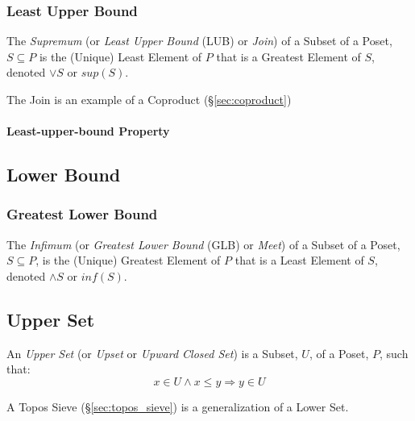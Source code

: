 \subsubsection{Least Upper Bound}\label{sec:least_upperbound}

The \emph{Supremum} (or \emph{Least Upper Bound} (LUB) or \emph{Join})
of a Subset of a Poset, $S \subseteq P$ is the (Unique) Least Element
of $P$ that is a Greatest Element of $S$, denoted $\vee S$ or $sup
(S)$.

The Join is an example of a Coproduct (\S\ref{sec:coproduct})



\paragraph{Least-upper-bound Property}\label{sec:leastupperbound_property}



\subsection{Lower Bound}\label{sec:lower_bound}

\subsubsection{Greatest Lower Bound}\label{sec:greatest_lowerbound}

The \emph{Infimum} (or \emph{Greatest Lower Bound} (GLB) or
\emph{Meet}) of a Subset of a Poset, $S \subseteq P$, is the (Unique)
Greatest Element of $P$ that is a Least Element of $S$, denoted
$\wedge S$ or $inf (S)$.



\subsection{Upper Set}\label{sec:upper_set}

An \emph{Upper Set} (or \emph{Upset} or \emph{Upward Closed Set}) is a
Subset, $U$, of a Poset, $P$, such that:
\[
  x \in U \wedge x \leq y \Rightarrow y \in U
\]

A Topos Sieve (\S\ref{sec:topos_sieve}) is a generalization of a Lower
Set.

